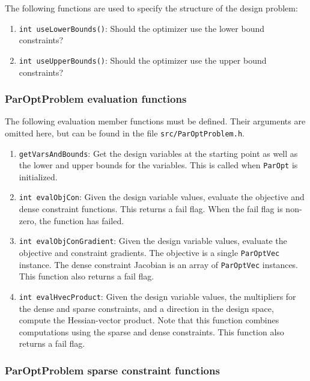 \documentclass[12pt]{article}
\begin{document}
The following functions are used to specify the structure of the design problem:
\begin{enumerate}
\item \texttt{int useLowerBounds()}: Should the optimizer use the lower bound constraints?
\item \texttt{int useUpperBounds()}: Should the optimizer use the upper bound constraints?
\end{enumerate}

\subsubsection{ParOptProblem evaluation functions}

The following evaluation member functions must be defined. Their arguments are omitted here, but can be found
in the file \texttt{src/ParOptProblem.h}.
\begin{enumerate}
\item \texttt{getVarsAndBounds}: Get the design variables at the starting point as well as the lower and upper bounds for the variables. This is called when \texttt{ParOpt} is initialized.

\item \texttt{int evalObjCon}: Given the design variable values, evaluate the objective and dense constraint functions. This returns a fail flag. When the fail flag is non-zero, the function has failed.

\item \texttt{int evalObjConGradient}: Given the design variable values, evaluate the objective and constraint gradients. The objective is a single \texttt{ParOptVec} instance. The dense constraint Jacobian is an array of \texttt{ParOptVec} instances. This function also returns a fail flag.

\item \texttt{int evalHvecProduct}: Given the design variable values, the multipliers for the dense and sparse constraints, and a direction in the design space, compute the Hessian-vector product. Note that this function combines computations using the sparse and dense constraints. This function also returns a fail flag.
\end{enumerate}

\subsubsection{ParOptProblem sparse constraint functions}
\end{document}

